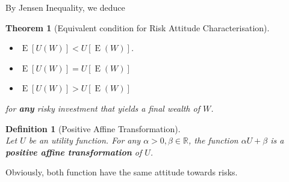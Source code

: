 \documentclass[12pt]{article}
\newtheorem{definition}{Definition}[section]
\newtheorem{theorem}{Theorem}[section]
\theoremstyle{definition}
\DeclareMathOperator{\expec}{E}
\begin{document}
By Jensen Inequality, we deduce
\begin{theorem}[Equivalent condition for Risk Attitude Characterisation]
\hfill\\\normalfont 
\begin{itemize}
  \item {}$\expec[ U (W)]< U [\expec(W)]$.
  \item {}$\expec[ U (W)]= U [\expec(W)]$
  \item {}$\expec[ U (W)]> U [\expec(W)]$
\end{itemize}
for \textbf{any} risky investment that yields a final wealth of $W$.
\end{theorem}
\begin{definition}[Positive Affine Transformation]\hfill\\\normalfont
Let $ U $ be an utility function. For any $\alpha>0, \beta\in\mathbb{R}$, the function $\alpha U +\beta$ is a \textbf{positive affine transformation} of $ U $.
\end{definition}
Obviously, both function have the same attitude towards risks.
\end{document}
